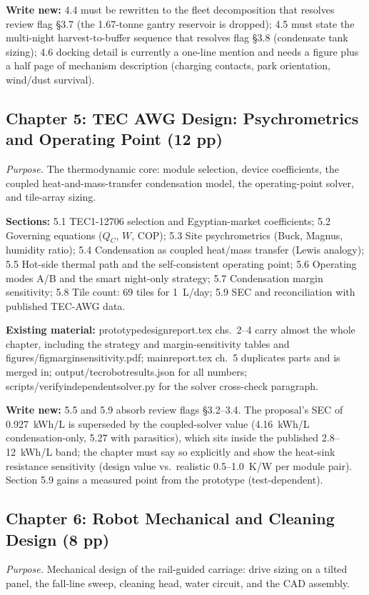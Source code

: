 \documentclass[11pt,a4paper]{article}
\newcommand{\f}[1]{{\ttfamily\def\_{\textunderscore\allowbreak}#1}}
\begin{document}
\textbf{Write new:} 4.4 must be rewritten to the fleet decomposition that
resolves review flag \S3.7 (the 1.67-tonne gantry reservoir is dropped); 4.5
must state the multi-night harvest-to-buffer sequence that resolves flag \S3.8
(condensate tank sizing); 4.6 docking detail is currently a one-line mention
and needs a figure plus a half page of mechanism description (charging contacts,
park orientation, wind/dust survival).

\subsection{Chapter 5: TEC AWG Design: Psychrometrics and Operating Point (12 pp)}
\textit{Purpose.} The thermodynamic core: module selection, device coefficients,
the coupled heat-and-mass-transfer condensation model, the operating-point
solver, and tile-array sizing.

\textbf{Sections:} 5.1 TEC1-12706 selection and Egyptian-market coefficients;
5.2 Governing equations ($Q_C$, $W$, COP); 5.3 Site psychrometrics (Buck,
Magnus, humidity ratio); 5.4 Condensation as coupled heat/mass transfer (Lewis
analogy); 5.5 Hot-side thermal path and the self-consistent operating point;
5.6 Operating modes A/B and the smart night-only strategy; 5.7 Condensation
margin sensitivity; 5.8 Tile count: 69 tiles for 1~L/day; 5.9 SEC and
reconciliation with published TEC-AWG data.

\textbf{Existing material:} \f{prototype\_design\_report.tex} chs.~2--4 carry
almost the whole chapter, including the strategy and margin-sensitivity tables
and \f{figures/fig\_margin\_sensitivity.pdf}; \f{main\_report.tex} ch.~5
duplicates parts and is merged in; \f{output/tec\_robot\_results.json} for all
numbers; \f{scripts/verify\_independent\_solver.py} for the solver
cross-check paragraph.

\textbf{Write new:} 5.5 and 5.9 absorb review flags \S3.2--3.4. The proposal's
SEC of 0.927~kWh/L is superseded by the coupled-solver value (4.16~kWh/L
condensation-only, 5.27 with parasitics), which sits inside the published
2.8--12~kWh/L band; the chapter must say so explicitly and show the heat-sink
resistance sensitivity (design value vs.\ realistic 0.5--1.0~K/W per module
pair). Section 5.9 gains a measured point from the prototype
(test-dependent).

\subsection{Chapter 6: Robot Mechanical and Cleaning Design (8 pp)}
\textit{Purpose.} Mechanical design of the rail-guided carriage: drive sizing on a
tilted panel, the fall-line sweep, cleaning head, water circuit, and the CAD
assembly.
\end{document}
